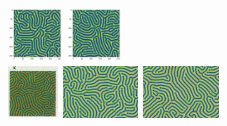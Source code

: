 \begin{itemize}
\includegraphics[height=1.4cm]{python_codes/fieldstone_171/pearson93_rand/kappa_solution_0050000_u}
\includegraphics[height=1.4cm]{python_codes/fieldstone_171/pearson93_rand/kappa_solution_final_u}\\
\includegraphics[height=1.4cm]{python_codes/fieldstone_171/images/pear93_kappa}
\includegraphics[height=1.4cm]{python_codes/fieldstone_171/images/munafo_kappa1}
\includegraphics[height=1.4cm]{python_codes/fieldstone_171/images/munafo_kappa2}


\end{itemize}
